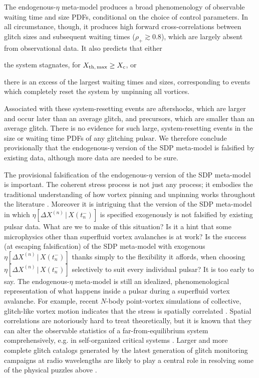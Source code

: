 The endogenous-$\eta$ meta-model produces a broad phenomenology of observable waiting time and size PDFs, conditional on the choice of control parameters. In all circumstance, though, it produces high forward cross-correlations between glitch sizes and subsequent waiting times ($\rho_+ \gtrsim 0.8$), which are largely absent from observational data. It also predicts that either \begin{enumerate*}
\item the system stagnates, for $X_{\rm th,\,max} \geq X_\textrm{c}$, or 
\item there is an excess of the largest waiting times and sizes, corresponding to events which completely reset the system by unpinning all vortices. 
\end{enumerate*}
Associated with these system-resetting events are aftershocks, which are larger and occur later than an average glitch, and precursors, which are smaller than an average glitch. There is no evidence for such large, system-resetting events in the size or waiting time PDFs of any glitching pulsar. We therefore conclude provisionally that the endogenous-$\eta$ version of the SDP meta-model is falsified by existing data, although more data are needed to be sure.

The provisional falsification of the endogenous-$\eta$ version of the SDP meta-model is important. The coherent stress process is not just any process; it embodies the traditional understanding of how vortex pinning and unpinning works throughout the literature \citep{Haskell2015}. Moreover it is intriguing that the version of the SDP meta-model in which $\eta[\Delta X^{(n)}\,|\,X(t_{n}^-)]$ is specified exogenously is not falsified by existing pulsar data. What are we to make of this situation? Is it a hint that some microphysics other than superfluid vortex avalanches is at work? Is the success (at escaping falsification) of the SDP meta-model with exogenous $\eta[\Delta X^{(n)}\,|\,X(t_{n}^-)]$ thanks simply to the flexibility it affords, when choosing $\eta[\Delta X^{(n)}\,|\,X(t_{n}^-)]$ selectively to suit every individual pulsar? It is too early to say. The endogenous-$\eta$ meta-model is still an idealized, phenomenological representation of what happens inside a pulsar during a superfluid vortex avalanche. For example, recent $N$-body point-vortex simulations of collective, glitch-like vortex motion indicates that the stress is spatially correlated \citep{Howitt2020}. Spatial correlations are notoriously hard to treat theoretically, but it is known that they can alter the observable statistics of a far-from-equilibrium system comprehensively, e.g. in self-organized critical systems \citep{Jensen1998, Aschwanden2018}. Larger and more complete glitch catalogs generated by the latest generation of glitch monitoring campaigns at radio wavelengths are likely to play a central role in resolving some of the physical puzzles above \citep{Stappers2011, Jankowski2019}.

